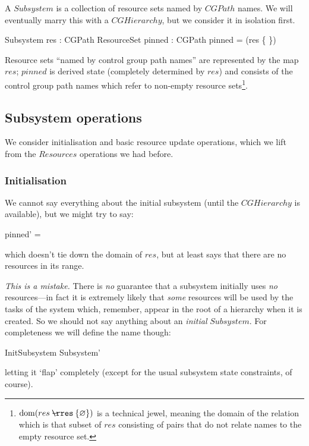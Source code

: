 \documentclass[a4paper,twoside,12pt]{article}
\begin{document}
A $Subsystem$ is a collection of resource sets named by $CGPath$ names. We will eventually marry
this with a $CGHierarchy$, but we consider it in isolation first.
\begin{schema}{Subsystem}
res : CGPath \ffun ResourceSet
\also
pinned : \finset CGPath
\where
pinned = \dom(res \nrres \{ \emptyset \})
\end{schema}
Resource sets ``named by control group path names'' are represented by the map $res$;
$pinned$ is derived state (completely determined by $res$) and consists of the control group path
names which refer to non-empty resource sets\footnote{$\dom(res \nrres \{ \emptyset \})$
is a technical jewel, meaning the domain
of the relation which is that subset of $res$ consisting of pairs that do not relate names to the empty
resource set.}.

\subsection{Subsystem operations}
We consider initialisation
and basic resource update operations, which we lift from the $Resources$ operations we had before.

\subsubsection{Initialisation}
We cannot say everything about the initial subsystem (until the $CGHierarchy$ is available), but we might try to
say:
\begin{zed}
pinned' = \emptyset
\end{zed}
which doesn't tie down the domain of $res$, but at least says that there are no resources in its range.

\emph{This is a mistake.}
There is \emph{no} guarantee that a subsystem initially uses \emph{no} resources---in fact it is
extremely likely that \emph{some} resources will be used by the tasks of the system which, remember, appear in the
root of a hierarchy when
it is created. So we should not say anything about an \emph{initial} $Subsystem$.
For completeness we will define the name though:
\begin{zed}
InitSubsystem  Subsystem'
\end{zed}
letting it `flap' completely (except for the usual subsystem state constraints, of course).
\end{document}

